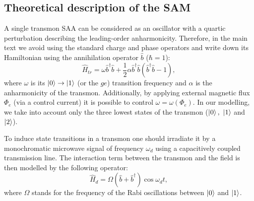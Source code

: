 \documentclass[%
 aip,
 amsmath,amssymb,
 reprint,%
]{revtex4-1}
\begin{document}
\subsection{Theoretical description of the SAM}

A single transmon SAA can be considered as an oscillator with a quartic perturbation describing the leading-order anharmonicity. Therefore, in the main text we avoid using the standard charge and phase operators and write down its Hamiltonian using the annihilation operator $\hat b$ ($\hbar = 1$):
\begin{equation}
\hat{{H}}_{tr} = \omega \hat b^{\dagger}\hat b +\frac{1}{2}\alpha \hat b^{\dagger}\hat b(\hat b^{\dagger}\hat b-1),
\end{equation}
where $\omega$ is its $\ket{0}\rightarrow\ket{1}$ (or the  $ge$) transition frequency and $\alpha$ is the anharmonicity of the transmon. Additionally, by applying external magnetic flux $\Phi_e$ (via a control current) it is possible to control $\omega = \omega(\Phi_e)$\cite{koch2007charge}. In our modelling, we take into account only the three lowest states of the transmon ($\ket{0},\ \ket{1}$ and $\ket{2}$).

To induce state transitions in a transmon one should irradiate it by a monochromatic microwave signal of frequency $\omega_d$ using a capacitively coupled transmission line. The interaction term between the transmon and the field is then modelled by the following operator: 
\begin{equation}
\hat H_{d} = \Omega (\hat b+\hat b^{\dagger}) \cos\omega_d t,
\end{equation}
where $\Omega$ stands for the frequency of the Rabi oscillations between $\ket{0}$ and $\ket{1}$.
\end{document}
